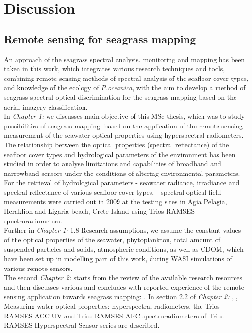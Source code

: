 \documentclass[11pt]{article}
\begin{document}
\section{Discussion}\label{sec:5}

\subsection{Remote sensing for seagrass mapping}
An approach of the seagrass spectral analysis, monitoring and mapping has been taken in this work, which integrates various research techniques and tools, combining remote sensing methods of spectral analysis of the seafloor cover types, and knowledge of the ecology of \textit{P.oceanica}, with the aim to develop a method of seagrass spectral optical discrimination for the seagrass mapping based on the aerial imagery classification.\vspace{1ex}\\
In \textit{Chapter 1:}  we discusses main objective of this MSc thesis, which was to study possibilities of seagrass mapping, based on the application of the remote sensing measurement of the seawater optical properties using hyperspectral radiometers. 
The relationship between the optical properties (spectral reflectance) of the seafloor cover types and hydrological parameters of the environment has been studied in order to analyse limitations and capabilities of broadband and narrowband sensors under the conditions of altering environmental parameters. For the retrieval of hydrological parameters - seawater radiance, irradiance and spectral reflectance of various seafloor cover types, - spectral optical field measurements were carried out in 2009 at the testing sites in Agia Pelagia, Heraklion and Ligaria beach, Crete Island using \ac{Trios-RAMSES} spectroradiometers.\\
Further in \textit{Chapter 1:} 1.8 Research assumptions, we assume the constant values of the optical properties of the seawater, phytoplankton, total amount of suspended particles and solids, atmospheric conditions, as well as \ac{CDOM}, which have been set up in modelling part of this work, during \ac{WASI} simulations of various remote sensors.\vspace{1ex}\\
The second \textit{Chapter 2:}  starts from the review of the available research resources and then discusses various  and concludes with reported experience of the remote sensing application towards seagrass mapping: . In section 2.2 of \textit{Chapter 2:} , , Measuring water optical properties: hyperspectral radiometers, the \ac{Trios-RAMSES}-ACC-\ac{UV} and \ac{Trios-RAMSES}-ARC spectroradiometers of \ac{Trios-RAMSES} Hyperspectral Sensor series are described. \\
\end{document}
